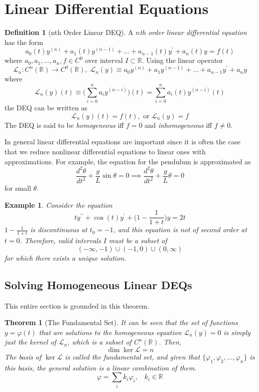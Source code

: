 \documentclass{article}
\newtheorem{theorem}{Theorem}[section]
\newtheorem{example}{Example}[section]
\theoremstyle{remark}
\theoremstyle{definition}
\newtheorem{definition}{Definition}[section]
\begin{document}
\section{Linear Differential Equations}

  \begin{definition}[nth Order Linear DEQ]
  A \textit{$n$th order linear differential equation} has the form
  \[a_0 (t) y^{(n)} + a_1 (t) y^{(n-1)} + \ldots + a_{n-1} (t) y^\prime + a_n (t) y = f(t)\]
  where $a_0, a_1, \ldots, a_n, f \in C^0$ over interval $I \subset \mathbb{R}$. Using the linear operator 
  \[\mathcal{L}_n : C^n (\mathbb{R}) \longrightarrow C^0 (\mathbb{R}), \; \mathcal{L}_n (y) \equiv a_0 y^{(n)} + a_1 y^{(n-1)} + \ldots + a_{n-1} y^\prime + a_n y\]
  where 
  \[\mathcal{L}_n (y) (t) \equiv \bigg( \sum_{i=0}^n a_i y^{(n-i)} \bigg) (t) = \sum_{i=0}^n a_i (t) y^{(n-i)} (t)\]
  the DEQ can be written as
  \[\mathcal{L}_n (y) (t) = f(t), \text{ or } \mathcal{L}_n (y) = f\]
  The DEQ is said to be \textit{homogeneous} iff $f = 0$ and \textit{inhomogeneous} iff $f \neq 0$. 
  \end{definition}

  In general linear differential equations are important since it is often the case that we reduce nonlinear differential equations to linear ones with approximations. For example, the equation for the pendulum is approximated as
  \[\frac{d^2 \theta}{d t^2} + \frac{g}{L} \sin{\theta} = 0 \implies \frac{d^2 \theta}{d t^2} + \frac{g}{L} \theta = 0\]
  for small $\theta$. 

  \begin{example}
  Consider the equation 
  \[t y^{\prime \prime} + \cos{(t)} y^\prime + \Big( 1 - \frac{1}{1+t}\Big) y = 2t\]
  $1 - \frac{1}{1+t}$ is discontinuous at $t_0 = -1$, and this equation is not of second order at $t=0$. Therefore, valid intervals $I$ must be a subset of 
  \[(-\infty, -1) \cup (-1, 0) \cup (0, \infty)\]
  for which there exists a unique solution. 
  \end{example}

  \subsection{Solving Homogeneous Linear DEQs}

    This entire section is grounded in this theorem. 
    \begin{theorem}[The Fundamental Set]
    It can be seen that the set of functions $y = \varphi(t)$ that are solutions to the homogeneous equation $\mathcal{L}_n (y) = 0$ is simply just the kernel of $\mathcal{L}_n$, which is a subset of $C^n (\mathbb{R})$. Then, 
    \[\dim \ker{\mathcal{L}} = n \]
    The basis of $\ker{\mathcal{L}}$ is called the \textit{fundamental set}, and given that $\{\varphi_1, \varphi_2, \ldots, \varphi_n\}$ is this basis, the general solution is a linear combination of them. 
    \[\varphi = \sum_i k_i \varphi_i, \;\;\; k_i \in \mathbb{R}\]
    \end{theorem}
\end{document}
